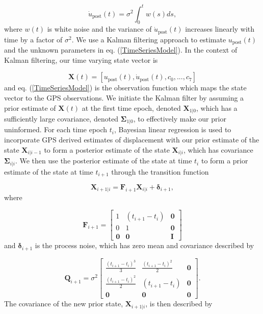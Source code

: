 \documentclass[draft,linenumbers]{AGUJournal}
\begin{document}
\begin{equation}
    \dot{u}_\mathrm{post}(t) = \sigma^2\int_0^t w(s) ds,
\end{equation}    
where $w(t)$ is white noise and the variance of $\dot{u}_\mathrm{post}(t)$ increases linearly with time by a factor of $\sigma^2$. We use a Kalman filtering approach to estimate $u_\mathrm{post}(t)$ and the unknown parameters in eq. (\ref{TimeSeriesModel}).  In the context of Kalman filtering, our time varying state vector is

\begin{equation}
    \mathbf{X}(t) = [u_\mathrm{post}(t),\dot u_\mathrm{post}(t), c_0, ..., c_7]
\end{equation}
and eq. (\ref{TimeSeriesModel}) is the observation function which maps the state vector to the GPS observations. We initiate the Kalman filter by assuming a prior estimate of $\mathbf{X}(t)$ at the first time epoch, denoted $\mathbf{X}_{1|0}$, which has a sufficiently large covariance, denoted $\mathbf{\Sigma}_{1|0}$, to effectively make our prior uninformed.  For each time epoch $t_i$, Bayesian linear regression is used to incorporate GPS derived estimates of displacement with our prior estimate of the state $\mathbf{X}_{i|i-1}$ to form a posterior estimate of the state $\mathbf{X}_{i|i}$, which has covariance $\mathbf{\Sigma}_{i|i}$.  We then use the posterior estimate of the state at time $t_i$ to form a prior estimate of the state at time $t_{i+1}$ through the transition function

\begin{equation}\label{predict}
  \mathbf{X}_{i+1|i} = \mathbf{F}_{i+1}\mathbf{X}_{i|i} + \mathbf{\delta}_{i+1}, 
\end{equation}
where 

\begin{equation}
  \mathbf{F}_{i+1} = 
  \left[
  \begin{array}{ccc}
    1           & (t_{i+1} - t_i) & \mathbf{0}\\
    0           & 1              & \mathbf{0}\\
    \mathbf{0}  & \mathbf{0}     & \mathbf{I}
  \end{array}
  \right]
\end{equation}
and $\mathbf{\delta}_{i+1}$ is the process noise, which has zero mean and covariance described by

\begin{equation}
  \mathbf{Q}_{i+1} = 
  \sigma^2 \left[
  \begin{array}{ccc}
  \frac{(t_{i+1} - t_i)^3}{3} & \frac{(t_{i+1} - t_{i})^2}{2} & \mathbf{0}\\
  \frac{(t_{i+1} - t_i)^2}{2} & (t_{i+1} - t_{i}) & \mathbf{0}\\ 
  \mathbf{0} & \mathbf{0} & \mathbf{0}
  \end{array}
  \right].
\end{equation}
The covariance of the new prior state, $\mathbf{X}_{i+1|i}$, is then described by
\end{document}
